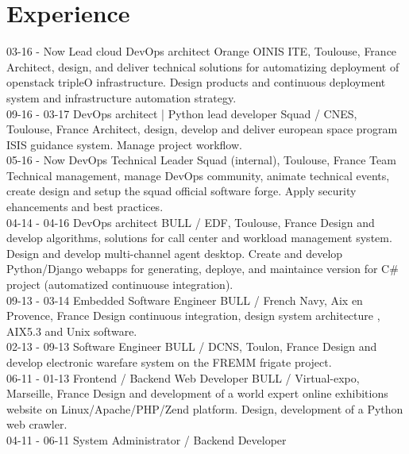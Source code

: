 \documentclass[]{friggeri-cv}
\begin{document}
\newpage
\section{Experience}
\begin{entrylist}
    \entry
        {03-16 - Now}
        {Lead cloud DevOps architect}
        {Orange OINIS ITE, Toulouse, France}
        {Architect, design, and deliver technical solutions for automatizing deployment of openstack tripleO infrastructure. Design products and continuous deployment system and infrastructure automation strategy.\\}
    \entry
        {09-16 - 03-17}
        {DevOps architect | Python lead developer}
        {Squad / CNES, Toulouse, France}
        {Architect, design, develop and deliver european space program ISIS guidance system. Manage project workflow.\\}
    \entry
        {05-16 - Now}
        {DevOps Technical Leader}
        {Squad (internal), Toulouse, France}
        {Team Technical management, manage DevOps community, animate technical events, create design and setup the squad official software forge. Apply security ehancements and best practices.\\}
    \entry
        {04-14 - 04-16}
        {DevOps architect}
        {BULL / EDF, Toulouse, France}
        {Design and develop algorithms, solutions for call center and workload management system. Design and develop multi-channel agent desktop.
        Create and develop Python/Django webapps for generating, deploye, and maintaince version for C\# project (automatized continuouse integration).\\}
    \entry
        {09-13 - 03-14}
        {Embedded Software Engineer}
        {BULL / French Navy, Aix en Provence, France}
        {Design continuous integration, design system architecture , AIX5.3 and Unix software.\\}
    \entry
        {02-13 - 09-13}
        {Software Engineer}
        {BULL / DCNS, Toulon, France}
        {Design and develop electronic warefare system on the FREMM frigate project.\\}
    \entry
        {06-11 - 01-13}
        {Frontend / Backend Web Developer}
        {BULL / Virtual-expo, Marseille, France}
        {Design and development of a world expert online exhibitions website on Linux/Apache/PHP/Zend platform. Design, development of a Python web crawler.\\}
    \entry
        {04-11 - 06-11}
        {System Administrator / Backend Developer}

\end{entrylist}
\end{document}
